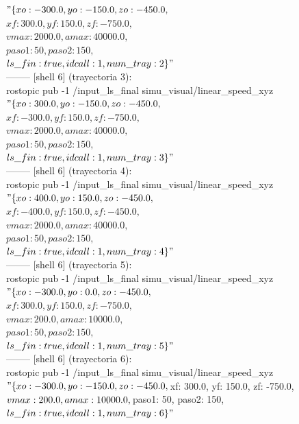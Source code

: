 $"\{xo: -300.0, yo: -150.0, zo: -450.0,$\\
$xf: 300.0, yf: 150.0, zf: -750.0,$\\
$vmax: 2000.0, amax: 40000.0,$\\
$paso1: 50,  paso2: 150,$\\
$ls\_fin: true, idcall: 1, num\_tray: 2\}"$\\
-------- [shell 6] (trayectoria 3): \\
rostopic pub -1 /input\_ls\_final simu\_visual/linear\_speed\_xyz\\ 
$"\{xo: 300.0, yo: -150.0, zo: -450.0,$\\
$xf: -300.0, yf: 150.0, zf: -750.0,$\\
$vmax: 2000.0, amax: 40000.0,$\\
$paso1: 50,  paso2: 150,$\\
$ls\_fin: true, idcall: 1, num\_tray: 3\}"$\\
-------- [shell 6] (trayectoria 4): \\
rostopic pub -1 /input\_ls\_final simu\_visual/linear\_speed\_xyz\\ 
$"\{xo: 400.0, yo: 150.0, zo: -450.0,$\\
$xf: -400.0, yf: 150.0, zf: -450.0,$\\
$vmax: 2000.0, amax: 40000.0,$\\
$paso1: 50,  paso2: 150,$\\
$ls\_fin: true, idcall: 1, num\_tray: 4\}"$\\
-------- [shell 6] (trayectoria 5): \\
rostopic pub -1 /input\_ls\_final simu\_visual/linear\_speed\_xyz\\ 
$"\{xo: -300.0, yo: 0.0, zo: -450.0,$\\
$xf: 300.0, yf: 150.0, zf: -750.0,$\\
$vmax: 200.0, amax: 10000.0,$\\
$paso1: 50,  paso2: 150,$\\
$ls\_fin: true, idcall: 1, num\_tray: 5\}"$\\
-------- [shell 6] (trayectoria 6): \\
rostopic pub -1 /input\_ls\_final simu\_visual/linear\_speed\_xyz\\ 
$"\{xo: -300.0, yo: -150.0, zo: -450.0,\\
$xf: 300.0, yf: 150.0, zf: -750.0,\\
$vmax: 200.0, amax: 10000.0,\\
$paso1: 50,  paso2: 150,\\
$ls\_fin: true, idcall: 1, num\_tray: 6\}"$\\
